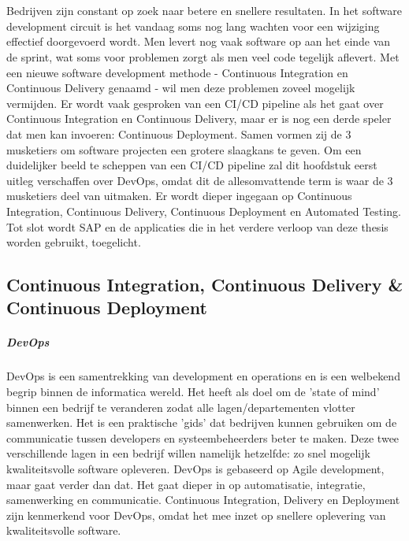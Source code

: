 \chapter{}
\label{ch:stand-van-zaken}
Bedrijven zijn constant op zoek naar betere en snellere resultaten. In het software development circuit is het vandaag soms nog lang wachten voor een wijziging effectief doorgevoerd wordt. Men levert nog vaak software op aan het einde van de sprint, wat soms voor problemen zorgt als men veel code tegelijk aflevert. Met een nieuwe software development methode - Continuous Integration en Continuous Delivery genaamd - wil men deze problemen zoveel mogelijk vermijden. Er wordt vaak gesproken van een CI/CD pipeline als het gaat over Continuous Integration en Continuous Delivery, maar er is nog een derde speler dat men kan invoeren: Continuous Deployment. Samen vormen zij de 3 musketiers om software projecten een grotere slaagkans te geven.
Om een duidelijker beeld te scheppen van een CI/CD pipeline zal dit hoofdstuk eerst uitleg verschaffen over DevOps, omdat dit de allesomvattende term is waar de 3 musketiers deel van uitmaken. Er wordt dieper ingegaan op Continuous Integration, Continuous Delivery, Continuous Deployment en Automated Testing. Tot slot wordt SAP en de applicaties die in het verdere verloop van deze thesis worden gebruikt, toegelicht.

\section{Continuous Integration, Continuous Delivery \& Continuous Deployment}
\label{sec:continuous-integration-continuous-delivery-continuous-deployment}
    \paragraph{DevOps}
    DevOps is een samentrekking van development en operations en is een welbekend begrip binnen de informatica wereld. Het heeft als doel om de 'state of mind' binnen een bedrijf te veranderen zodat alle lagen/departementen vlotter samenwerken. Het is een praktische 'gids' dat bedrijven kunnen gebruiken om de communicatie tussen developers en systeembeheerders beter te maken. Deze twee verschillende lagen in een bedrijf willen namelijk hetzelfde: zo snel mogelijk kwaliteitsvolle software opleveren. DevOps is gebaseerd op Agile development, maar gaat verder dan dat. Het gaat dieper in op automatisatie, integratie, samenwerking en communicatie. 
    Continuous Integration, Delivery en Deployment zijn kenmerkend voor DevOps, omdat het mee inzet op snellere oplevering van kwaliteitsvolle software. ~\autocite{Riti2018}
    

